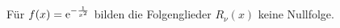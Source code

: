 \begin{note}Für $f(x) = \operatorname{e}^{-\frac{1}{x^2}}$ bilden die Folgenglieder $R_\nu(x)$ keine Nullfolge.\end{note}

%
%
